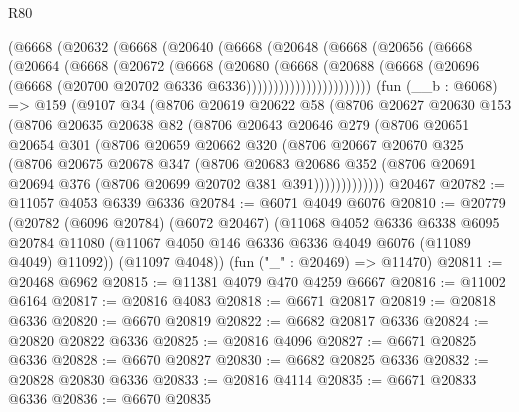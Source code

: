 \begin{lexlean}{R80}
\begin{coremodule}
          (@6668
            (@20632
              (@6668
                (@20640
                  (@6668
                    (@20648
                      (@6668
                        (@20656
                          (@6668
                            (@20664
                              (@6668
                                (@20672
                                  (@6668
                                    (@20680
                                      (@6668
                                        (@20688
                                          (@6668
                                            (@20696
                                              (@6668
                                                (@20700 @20702 @6336 @6336)))))))))))))))))))))))
    (fun (__b : @6068) =>
    @159
      (@9107
        @34
        (@8706
          @20619
          @20622
          @58
          (@8706
            @20627
            @20630
            @153
            (@8706
              @20635
              @20638
              @82
              (@8706
                @20643
                @20646
                @279
                (@8706
                  @20651
                  @20654
                  @301
                  (@8706
                    @20659
                    @20662
                    @320
                    (@8706
                      @20667
                      @20670
                      @325
                      (@8706
                        @20675
                        @20678
                        @347
                        (@8706
                          @20683
                          @20686
                          @352
                          (@8706 @20691 @20694 @376 (@8706 @20699 @20702 @381 @391)))))))))))))
    @20467
@20782 := @11057 @4053 @6339 @6336
@20784 := @6071 @4049 @6076
@20810 := @20779
    (@20782
      (@6096 @20784)
      (@6072 @20467)
      (@11068
        @4052
        @6336
        @6338
        @6095
        @20784
        @11080
        (@11067 @4050 @146 @6336 @6336 @4049 @6076 (@11089 @4049) @11092))
      (@11097 @4048))
    (fun ("_" : @20469) => @11470)
@20811 := @20468 @6962
@20815 := @11381 @4079 @470 @4259 @6667
@20816 := @11002 @6164
@20817 := @20816 @4083
@20818 := @6671 @20817
@20819 := @20818 @6336
@20820 := @6670 @20819
@20822 := @6682 @20817 @6336
@20824 := @20820 @20822 @6336
@20825 := @20816 @4096
@20827 := @6671 @20825 @6336
@20828 := @6670 @20827
@20830 := @6682 @20825 @6336
@20832 := @20828 @20830 @6336
@20833 := @20816 @4114
@20835 := @6671 @20833 @6336
@20836 := @6670 @20835

\end{coremodule}
\end{lexlean}
